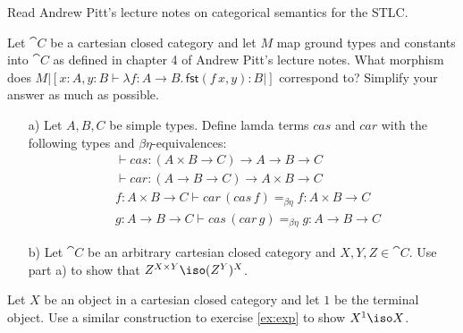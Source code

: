 \def\pathToRoot{../../}

\usepackage{semantic}



\author{Joachim Bard}

\begin{hint}
    Read Andrew Pitt's lecture notes on categorical semantics for the STLC.
\end{hint}

\begin{exercise}
    Let $\cat{C}$ be a cartesian closed category and let $M$ map ground types and constants into $\cat{C}$ as defined in chapter 4 of Andrew Pitt's lecture notes.
    What morphism does $M |[x: A, y: B \vdash \lambda f: A \to B.\,\mathsf{fst}(f\,x, y) : B|]$ correspond to?
    Simplify your answer as much as possible.
\end{exercise}

\begin{exercise}
    \label{ex:exp}
    \begin{itemize}
        \item[a)] Let $A, B, C$ be simple types.
            Define lamda terms $cas$ and $car$ with the following types and $\beta\eta$-equivalences:
            \begin{align*}
                & \vdash cas: (A \times B \to C) \to A \to B \to C \\
                & \vdash car: (A \to B \to C) \to A \times B \to C\\
                & f: A \times B \to C \vdash car\, (cas\, f) =_{\beta\eta} f : A \times B \to C \\
                & g: A \to B \to C \vdash cas\, (car\, g) =_{\beta\eta} g : A \to B \to C
            \end{align*}
        \item[b)] Let $\cat{C}$ be an arbitrary cartesian closed category and $X, Y, Z \in \cat{C}$.
            Use part a) to show that $Z^{X \times Y} \iso (Z^Y)^X$.
    \end{itemize}
\end{exercise}

\begin{exercise}
    Let $X$ be an object in a cartesian closed category and let $1$ be the terminal object.
    Use a similar construction to exercise \ref{ex:exp} to show $X^1 \iso X$.
\end{exercise}

